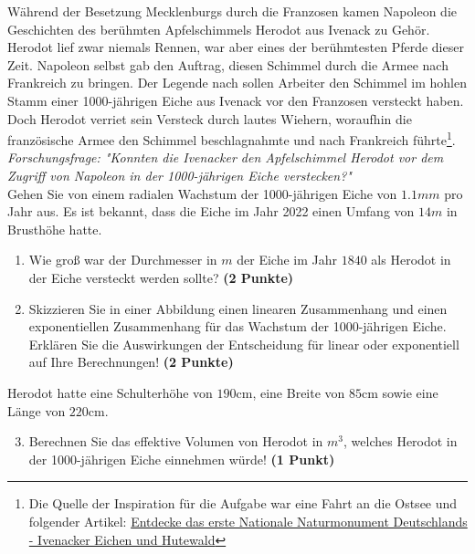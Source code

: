 \documentclass[a4paper, 9pt]{scrartcl}\usepackage[]{graphicx}\usepackage[]{xcolor}
\begin{document}
W{\"a}hrend der Besetzung Mecklenburgs durch die Franzosen kamen Napoleon die
Geschichten des ber{\"u}hmten Apfelschimmels Herodot aus Ivenack zu
Geh{\"o}r. Herodot lief zwar niemals Rennen, war aber eines der ber{\"u}hmtesten
Pferde dieser Zeit. Napoleon selbst gab den Auftrag, diesen
Schimmel durch die Armee nach Frankreich zu bringen. Der Legende nach
sollen Arbeiter den Schimmel im hohlen Stamm einer 1000-j{\"a}hrigen Eiche aus Ivenack vor
den Franzosen versteckt haben. Doch Herodot verriet sein Versteck durch
lautes Wiehern, woraufhin die franz{\"o}sische Armee den Schimmel
beschlagnahmte und nach Frankreich f{\"u}hrte\footnote{Die Quelle der Inspiration
  für die Aufgabe war eine Fahrt an die Ostsee und folgender Artikel:
  \href{https://www.wald-mv.de/landingpage/ivenacker-eichen/}{Entdecke das erste Nationale Naturmonument Deutschlands - Ivenacker Eichen und Hutewald}}. \\



\textit{Forschungsfrage: "Konnten die Ivenacker den Apfelschimmel Herodot
  vor dem Zugriff von Napoleon in der 1000-j{\"a}hrigen Eiche verstecken?"} \\

Gehen Sie von einem radialen Wachstum der 1000-j{\"a}hrigen Eiche von
$1.1mm$ pro Jahr aus. Es ist bekannt, dass die Eiche im
Jahr 2022 einen Umfang von $14m$ in Brusth{\"o}he hatte.

\begin{enumerate}
\item Wie gro{\ss} war der Durchmesser in $m$ der Eiche im Jahr $1840$ als
  Herodot in der Eiche versteckt werden sollte?
  \textbf{(2 Punkte)}
\item Skizzieren Sie in einer Abbildung einen linearen Zusammenhang und einen
exponentiellen Zusammenhang f{\"u}r das Wachstum der 1000-j{\"a}hrigen Eiche. Erkl{\"a}ren Sie die
Auswirkungen der Entscheidung f{\"u}r linear oder exponentiell auf Ihre
Berechnungen! \textbf{(2 Punkte)}
\end{enumerate}
 
Herodot hatte eine Schulterh{\"o}he von $190$cm, eine Breite von
$85$cm sowie eine L{\"a}nge von  $220$cm.

\begin{enumerate}
  \setcounter{enumi}{2}
\item Berechnen Sie das effektive Volumen von Herodot in $m^3$, welches
  Herodot in der 1000-j{\"a}hrigen Eiche einnehmen w{\"u}rde! \textbf{(1 Punkt)}
\end{enumerate}
\end{document}
